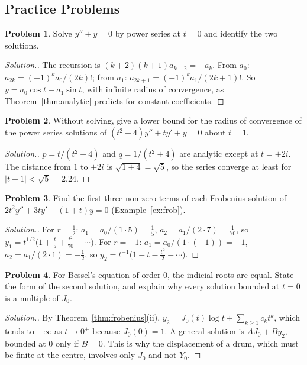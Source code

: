 \documentclass[11pt,a4paper]{article}
\numberwithin{equation}{section}
\theoremstyle{definition}
\newtheorem{problemx}{Problem}[subsection]
\newenvironment{problem}{\begin{problemx}}{\end{problemx}}
\newenvironment{solution}
  {\renewcommand{\qedsymbol}{}\begin{proof}[\textit{Solution}.]}
  {\end{proof}}
\begin{document}
\subsection{Practice Problems}

\begin{problem}
Solve $y'' + y = 0$ by power series at $t = 0$ and identify the two solutions.
\end{problem}

\begin{solution}
The recursion is $(k + 2)(k + 1)a_{k+2} = -a_k$. From $a_0$: $a_{2k} = (-1)^ka_0/(2k)!$; from $a_1$: $a_{2k+1} = (-1)^ka_1/(2k + 1)!$. So $y = a_0\cos t + a_1\sin t$, with infinite radius of convergence, as Theorem~\ref{thm:analytic}
predicts for constant coefficients.
\end{solution}

\begin{problem}
Without solving, give a lower bound for the radius of convergence of the power series solutions of $(t^2 + 4)y'' + ty' + y = 0$ about $t = 1$.
\end{problem}

\begin{solution}
$p = t/(t^2 + 4)$ and $q = 1/(t^2 + 4)$ are analytic except at $t = \pm2i$. The distance from $1$ to $\pm2i$ is $\sqrt{1 + 4} = \sqrt5$, so the series converge at least for $|t - 1| < \sqrt5 = 2.24$.
\end{solution}

\begin{problem}
Find the first three non-zero terms of each Frobenius solution of $2t^2y'' + 3ty' - (1 + t)y = 0$ (Example~\ref{ex:frob}).
\end{problem}

\begin{solution}
For $r = \frac12$: $a_1 = a_0/(1 \cdot 5) = \frac15$, $a_2 = a_1/(2 \cdot 7) = \frac{1}{70}$, so $y_1 = t^{1/2}\bigl(1 + \frac t5 + \frac{t^2}{70} + \cdots\bigr)$. For $r = -1$: $a_1 = a_0/(1 \cdot (-1)) = -1$, $a_2 = a_1/(2 \cdot 1) = -\frac12$, so
$y_2 = t^{-1}\bigl(1 - t - \frac{t^2}{2} - \cdots\bigr)$.
\end{solution}

\begin{problem}
For Bessel's equation of order $0$, the indicial roots are equal. State the form of the second solution, and explain why every solution bounded at $t = 0$ is a multiple of $J_0$.
\end{problem}

\begin{solution}
By Theorem~\ref{thm:frobenius}(ii), $y_2 = J_0(t)\log t + \sum_{k\geq1}c_kt^k$, which tends to $-\infty$ as $t \to 0^+$ because $J_0(0) = 1$. A general solution is $AJ_0 + By_2$, bounded at $0$ only if $B = 0$. This is why the
displacement of a drum, which must be finite at the centre, involves only $J_0$ and not $Y_0$.
\end{solution}
\end{document}

